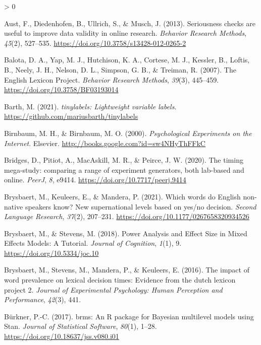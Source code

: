 \documentclass[
  english,
  man,floatsintext]{apa6}
\newlength{\cslhangindent}
\newenvironment{CSLReferences}[2] %
 {%
  \setlength{\parindent}{0pt}
  \ifodd #1 \everypar{\setlength{\hangindent}{\cslhangindent}}\ignorespaces\fi
  \ifnum #2 > 0
  \setlength{\parskip}{#2\baselineskip}
  \fi
 }%
 {}
\begin{document}
\begin{CSLReferences}{1}{0}
\leavevmode\hypertarget{ref-austSeriousnessChecksAre2013}{}%
Aust, F., Diedenhofen, B., Ullrich, S., \& Musch, J. (2013). Seriousness checks are useful to improve data validity in online research. \emph{Behavior Research Methods}, \emph{45}(2), 527--535. \url{https://doi.org/10.3758/s13428-012-0265-2}

\leavevmode\hypertarget{ref-balota2007}{}%
Balota, D. A., Yap, M. J., Hutchison, K. A., Cortese, M. J., Kessler, B., Loftis, B., Neely, J. H., Nelson, D. L., Simpson, G. B., \& Treiman, R. (2007). The English Lexicon Project. \emph{Behavior Research Methods}, \emph{39}(3), 445--459. \url{https://doi.org/10.3758/BF03193014}

\leavevmode\hypertarget{ref-R-tinylabels}{}%
Barth, M. (2021). \emph{{tinylabels}: Lightweight variable labels}. \url{https://github.com/mariusbarth/tinylabels}

\leavevmode\hypertarget{ref-birnbaumPsychologicalExperimentsInternet2000a}{}%
Birnbaum, M. H., \& Birnbaum, M. O. (2000). \emph{Psychological {Experiments} on the {Internet}}. {Elsevier}. \url{http://books.google.com?id=sw4NHyThFFkC}

\leavevmode\hypertarget{ref-bridges2020}{}%
Bridges, D., Pitiot, A., MacAskill, M. R., \& Peirce, J. W. (2020). The timing mega-study: comparing a range of experiment generators, both lab-based and online. \emph{PeerJ}, \emph{8}, e9414. \url{https://doi.org/10.7717/peerj.9414}

\leavevmode\hypertarget{ref-brysbaert2021a}{}%
Brysbaert, M., Keuleers, E., \& Mandera, P. (2021). Which words do English non-native speakers know? New supernational levels based on yes/no decision. \emph{Second Language Research}, \emph{37}(2), 207--231. \url{https://doi.org/10.1177/0267658320934526}

\leavevmode\hypertarget{ref-brysbaert2018}{}%
Brysbaert, M., \& Stevens, M. (2018). Power Analysis and Effect Size in Mixed Effects Models: A Tutorial. \emph{Journal of Cognition}, \emph{1}(1), 9. \url{https://doi.org/10.5334/joc.10}

\leavevmode\hypertarget{ref-brysbaert2016impact}{}%
Brysbaert, M., Stevens, M., Mandera, P., \& Keuleers, E. (2016). The impact of word prevalence on lexical decision times: Evidence from the dutch lexicon project 2. \emph{Journal of Experimental Psychology: Human Perception and Performance}, \emph{42}(3), 441.

\leavevmode\hypertarget{ref-R-brms_a}{}%
Bürkner, P.-C. (2017). {brms}: An {R} package for {Bayesian} multilevel models using {Stan}. \emph{Journal of Statistical Software}, \emph{80}(1), 1--28. \url{https://doi.org/10.18637/jss.v080.i01}


\end{CSLReferences}
\end{document}
